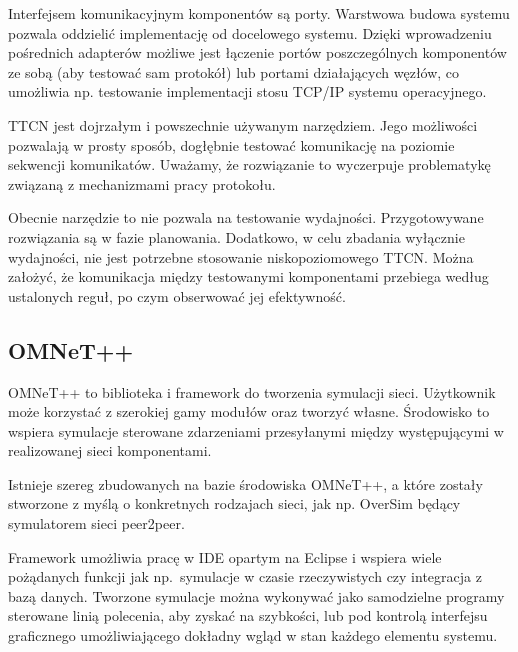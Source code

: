 \documentclass[00-praca-magisterska.tex]{subfiles}
\begin{document}
Interfejsem komunikacyjnym komponentów są porty. Warstwowa budowa systemu
pozwala oddzielić implementację od docelowego systemu. Dzięki wprowadzeniu
pośrednich adapterów możliwe jest łączenie portów poszczególnych komponentów ze
sobą (aby testować sam protokół) lub portami działających węzłów, co umożliwia
np. testowanie implementacji stosu TCP/IP systemu operacyjnego.


TTCN jest dojrzałym i powszechnie używanym narzędziem. Jego możliwości pozwalają
w prosty sposób, dogłębnie testować komunikację na poziomie sekwencji
komunikatów. Uważamy, że rozwiązanie to wyczerpuje problematykę związaną z
mechanizmami pracy protokołu.

Obecnie narzędzie to nie pozwala na testowanie wydajności. Przygotowywane
rozwiązania są w fazie planowania. Dodatkowo, w celu zbadania wyłącznie
wydajności, nie jest potrzebne stosowanie niskopoziomowego TTCN. Można założyć,
że komunikacja między testowanymi komponentami przebiega według ustalonych
reguł, po czym obserwować jej efektywność.

\subsection{OMNeT++}

OMNeT++ to biblioteka i framework do tworzenia symulacji sieci. Użytkownik może korzystać z
szerokiej gamy modułów oraz tworzyć własne. Środowisko to wspiera symulacje
sterowane zdarzeniami przesyłanymi między występującymi w realizowanej sieci
komponentami.


Istnieje szereg  zbudowanych na bazie środowiska OMNeT++, a które
zostały stworzone z myślą o konkretnych rodzajach sieci, jak np. OverSim będący
symulatorem sieci peer2peer.

Framework umożliwia pracę w IDE opartym na Eclipse i wspiera wiele pożądanych
funkcji jak np.~symulacje w czasie rzeczywistych czy integracja z bazą danych.
Tworzone symulacje można wykonywać jako samodzielne programy sterowane linią
polecenia, aby zyskać na szybkości, lub pod kontrolą interfejsu graficznego
umożliwiającego dokładny wgląd w stan każdego elementu systemu.
\end{document}
